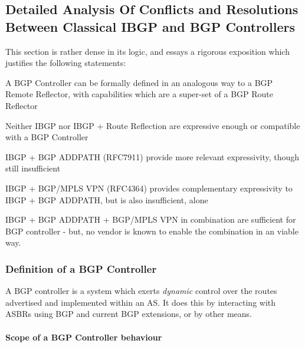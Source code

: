 \subsection{Detailed Analysis Of Conflicts and Resolutions Between Classical IBGP and BGP Controllers}
This section is rather dense in its logic, and essays a rigorous exposition
which justifies the following statements:

\begin{myitemize}
	\item A BGP Controller can be formally defined in an analogous way to a BGP Remote Reflector, with capabilities which are a super-set of a BGP Route Reflector
	\item Neither IBGP nor IBGP + Route Reflection are expressive enough or compatible with a BGP Controller
	\item IBGP + BGP ADDPATH (RFC7911)\cite{rfc7911} provide more relevant expressivity, though still insufficient
	\item IBGP + BGP/MPLS VPN (RFC4364)\cite{rfc4364} provides complementary expressivity to IBGP + BGP ADDPATH, but is also insufficient, alone
	\item IBGP + BGP ADDPATH + BGP/MPLS VPN in combination are sufficient for BGP controller - but, no vendor is known to enable the combination in an viable way.
\end{myitemize}

\subsubsection{Definition of a BGP Controller}
A BGP controller is a system which exerts \emph{dynamic} control over the
routes advertised and implemented within an AS.  It does this by interacting
with ASBRs using BGP and current BGP extensions, or by other means.

\paragraph{Scope of a BGP Controller behaviour}

